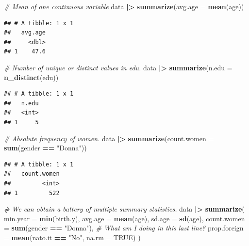 \documentclass[
]{book}
\newenvironment{Shaded}{\begin{snugshade}}{\end{snugshade}}
\newcommand{\AttributeTok}[1]{\textcolor[rgb]{0.13,0.29,0.53}{#1}}
\newcommand{\CommentTok}[1]{\textcolor[rgb]{0.56,0.35,0.01}{\textit{#1}}}
\newcommand{\ConstantTok}[1]{\textcolor[rgb]{0.56,0.35,0.01}{#1}}
\newcommand{\FunctionTok}[1]{\textcolor[rgb]{0.13,0.29,0.53}{\textbf{#1}}}
\newcommand{\NormalTok}[1]{#1}
\newcommand{\SpecialCharTok}[1]{\textcolor[rgb]{0.81,0.36,0.00}{\textbf{#1}}}
\newcommand{\StringTok}[1]{\textcolor[rgb]{0.31,0.60,0.02}{#1}}
\begin{document}
\begin{Shaded}
\begin{Highlighting}[]
\CommentTok{\# Mean of one continuous variable}
\NormalTok{data }\SpecialCharTok{|\textgreater{}} 
  \FunctionTok{summarize}\NormalTok{(}\AttributeTok{avg.age =} \FunctionTok{mean}\NormalTok{(age))}
\end{Highlighting}
\end{Shaded}

\begin{verbatim}
## # A tibble: 1 x 1
##   avg.age
##     <dbl>
## 1    47.6
\end{verbatim}

\begin{Shaded}
\begin{Highlighting}[]
\CommentTok{\# Number of unique or distinct values in edu.}
\NormalTok{data }\SpecialCharTok{|\textgreater{}} 
  \FunctionTok{summarize}\NormalTok{(}\AttributeTok{n.edu =} \FunctionTok{n\_distinct}\NormalTok{(edu))}
\end{Highlighting}
\end{Shaded}

\begin{verbatim}
## # A tibble: 1 x 1
##   n.edu
##   <int>
## 1     5
\end{verbatim}

\begin{Shaded}
\begin{Highlighting}[]
\CommentTok{\# Absolute frequency of women.}
\NormalTok{data }\SpecialCharTok{|\textgreater{}} 
  \FunctionTok{summarize}\NormalTok{(}\AttributeTok{count.women =} \FunctionTok{sum}\NormalTok{(gender }\SpecialCharTok{==} \StringTok{"Donna"}\NormalTok{))}
\end{Highlighting}
\end{Shaded}

\begin{verbatim}
## # A tibble: 1 x 1
##   count.women
##         <int>
## 1         522
\end{verbatim}

\begin{Shaded}
\begin{Highlighting}[]
\CommentTok{\# We can obtain a battery of multiple summary statistics.}
\NormalTok{data }\SpecialCharTok{|\textgreater{}} 
  \FunctionTok{summarize}\NormalTok{(}
    \AttributeTok{min.year =} \FunctionTok{min}\NormalTok{(birth.y),}
    \AttributeTok{avg.age =} \FunctionTok{mean}\NormalTok{(age),}
    \AttributeTok{sd.age =} \FunctionTok{sd}\NormalTok{(age),}
    \AttributeTok{count.women =} \FunctionTok{sum}\NormalTok{(gender }\SpecialCharTok{==} \StringTok{"Donna"}\NormalTok{),}
    \CommentTok{\# What am I doing in this last line?}
    \AttributeTok{prop.foreign =} \FunctionTok{mean}\NormalTok{(nato.it }\SpecialCharTok{==} \StringTok{"No"}\NormalTok{, }\AttributeTok{na.rm =} \ConstantTok{TRUE}\NormalTok{)}
\NormalTok{  )}
\end{Highlighting}
\end{Shaded}
\end{document}
